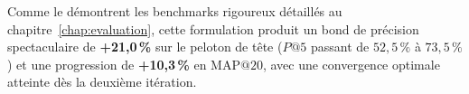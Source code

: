 Comme le démontrent les benchmarks rigoureux détaillés au chapitre~\ref{chap:evaluation}, cette formulation produit un bond de précision spectaculaire de \textbf{+21,0\,\%} sur le peloton de tête ($P@5$ passant de $52,5\,\%$ à $73,5\,\%$) et une progression de \textbf{+10,3\,\%} en $\text{MAP}@20$, avec une convergence optimale atteinte dès la deuxième itération.
